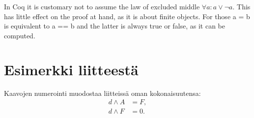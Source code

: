 \documentclass[english, 12pt, a4paper, sci, utf8, a-1b, online]{aaltothesis}
\begin{document}
In Coq it is customary not to assume the law of excluded middle $\forall a : a \lor \lnot a$. This has little effect on the proof at hand, as it is about finite objects. For those a = b is equivalent to a == b and the latter is always true or false, as it can be computed.

\clearpage
\thesisbibliography{}




\clearpage
\thesisappendix{}

\section{Esimerkki liitteestä\label{LiiteA}}

Kaavojen numerointi muodostaa liitteissä oman kokonaisuutensa:
\begin{align}
d \wedge A &= F, \label{liitekaava1}\\
d \wedge F &= 0. \label{liitekaava2}
\end{align}
\end{document}
